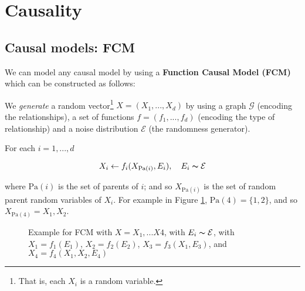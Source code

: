 \section{Causality}

\subsection{Causal models: FCM}

We can model any causal model by using a \textbf{Function Causal Model (FCM)} which can be constructed as follows:

We \textit{generate} a random vector\footnote{That is, each $X_i$ is a random variable.}
$X = (X_1, ..., X_d)$ by using a graph $\mathcal{G}$ (encoding the relationships),
a set of functions $f = (f_1, ..., f_d)$ (encoding the type of relationship) and a noise distribution $\mathcal{E}$
(the randomness generator).

For each $i = 1, ..., d$

$$
    X_i \leftarrow f_i(X_{\text{Pa}(i)}, E_i), \quad E_i \thicksim \mathcal{E}
$$

where $\text{Pa}(i)$ is the set of parents of $i$; and so $X_{\text{Pa}(i)}$ is the set of random parent
random variables of $X_i$. For example in Figure \ref{fig:fcm_1}, $\text{Pa}(4) = \{1, 2\}$, 
and so $X_{\text{Pa}(4)} = X_1, X_2$.

\begin{figure}[!h]
    \centering

    \caption{ Example for FCM with $X = X_1, ... X4$, with $E_i \thicksim \mathcal{E}$, 
    with $X_1 = f_1(E_1)$, $X_2 = f_2(E_2)$, $X_3 = f_3(X_1, E_3)$, and 
    $X_4 = f_4(X_1, X_2, E_4)$}
    \label{fig:fcm_1}

\end{figure}


